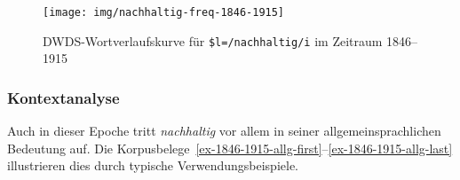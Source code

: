 \documentclass[
    german,
    a4paper,%
    12pt,%
    oneside,%
    toc=bibliography,
    final,
]{scrartcl}
\begin{document}
\begin{figure}[h!]
	\centering
	
	\texttt{[image: img/nachhaltig-freq-1846-1915]}
	\caption[corpus-size]{DWDS-Wortverlaufskurve für \lstinline|$l=/nachhaltig/i| im Zeitraum 1846–1915\protect\footnotemark}
	\label{fig:nachhaltig-freq-1846-1915}
\end{figure}

\subsubsection{Kontextanalyse}

Auch in dieser Epoche tritt \textit{nachhaltig} vor allem in seiner allgemeinsprachlichen Bedeutung auf. Die Korpusbelege~\ref{ex-1846-1915-allg-first}–\ref{ex-1846-1915-allg-last} illustrieren dies durch typische Verwendungsbeispiele.
\end{document}
